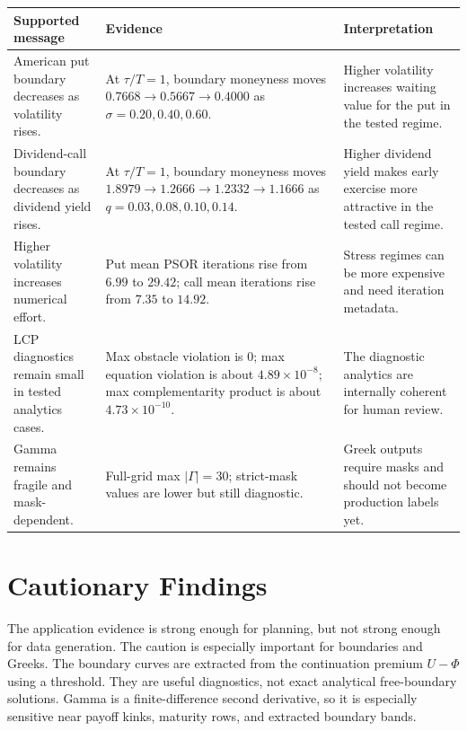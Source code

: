 \documentclass[11pt,a4paper]{article}
\begin{document}
\begin{longtable}{L{0.30\textwidth} L{0.33\textwidth} L{0.25\textwidth}}
\toprule
Supported message & Evidence & Interpretation \\
\midrule
\endhead
American put boundary decreases as volatility rises. & At \(\tau/T=1\), boundary moneyness moves \(0.7668 \rightarrow 0.5667 \rightarrow 0.4000\) as \(\sigma=0.20,0.40,0.60\). & Higher volatility increases waiting value for the put in the tested regime. \\
Dividend-call boundary decreases as dividend yield rises. & At \(\tau/T=1\), boundary moneyness moves \(1.8979 \rightarrow 1.2666 \rightarrow 1.2332 \rightarrow 1.1666\) as \(q=0.03,0.08,0.10,0.14\). & Higher dividend yield makes early exercise more attractive in the tested call regime. \\
Higher volatility increases numerical effort. & Put mean PSOR iterations rise from \(6.99\) to \(29.42\); call mean iterations rise from \(7.35\) to \(14.92\). & Stress regimes can be more expensive and need iteration metadata. \\
LCP diagnostics remain small in tested analytics cases. & Max obstacle violation is \(0\); max equation violation is about \(4.89\times10^{-8}\); max complementarity product is about \(4.73\times10^{-10}\). & The diagnostic analytics are internally coherent for human review. \\
Gamma remains fragile and mask-dependent. & Full-grid max \(|\Gamma|=30\); strict-mask values are lower but still diagnostic. & Greek outputs require masks and should not become production labels yet. \\
\bottomrule
\end{longtable}

\section{Cautionary Findings}

The application evidence is strong enough for planning, but not strong enough for data generation.
The caution is especially important for boundaries and Greeks. The boundary curves are extracted
from the continuation premium \(U-\Phi\) using a threshold. They are useful diagnostics, not exact
analytical free-boundary solutions. Gamma is a finite-difference second derivative, so it is
especially sensitive near payoff kinks, maturity rows, and extracted boundary bands.
\end{document}
